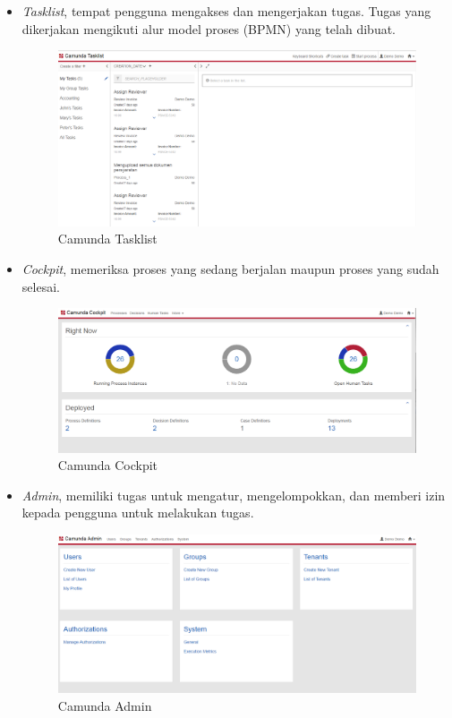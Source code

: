 \begin{itemize}
\begin{enumerate}
\end{enumerate}
	
	\item \textit{Tasklist}, tempat pengguna mengakses dan mengerjakan tugas. Tugas yang dikerjakan mengikuti alur model proses (BPMN) yang telah dibuat. 
		\begin{figure}[H]
			\centering
			\includegraphics[scale=0.4]{Gambar/Bab-2/bpms/camundaTaskList}
			\caption{Camunda Tasklist} 
			\label{fig:camundatasklist}
		\end{figure}
	
	\item \textit{Cockpit}, memeriksa proses yang sedang berjalan maupun proses yang sudah selesai.
	\begin{figure}[H]
	\centering
	\includegraphics[scale=0.4]{Gambar/Bab-2/bpms/camundaCockpit}
	\caption{Camunda Cockpit} 
	\label{fig:camundacockpit}
\end{figure}
	
\item \textit{Admin}, memiliki tugas untuk mengatur, mengelompokkan, dan memberi izin kepada pengguna untuk melakukan tugas.
	\begin{figure}[H]
	\centering
	\includegraphics[scale=0.4]{Gambar/Bab-2/bpms/camundaAdmin}
	\caption{Camunda Admin} 
	\label{fig:camundaadmin}
\end{figure}


\end{itemize}
